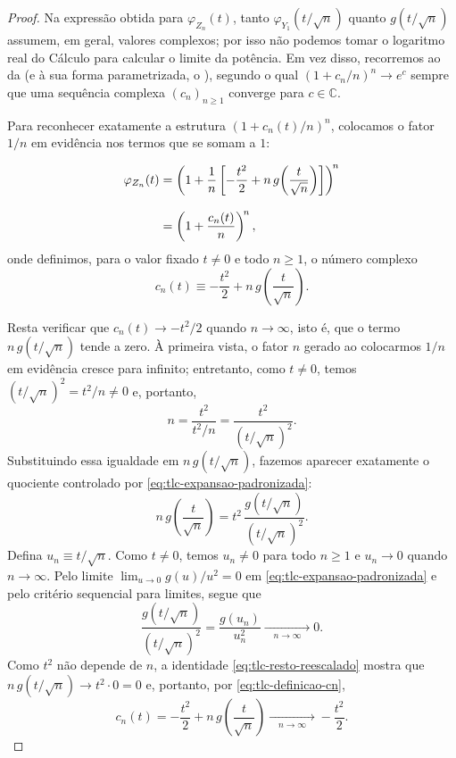 \documentclass[12pt,portuguese]{article}
\theoremstyle{definition}
\theoremstyle{plainexercise}
\theoremstyle{starredexercise}
\theoremstyle{definition}
\begin{document}
\begin{proof}
Na expressão obtida para $\varphi_{Z_n}(t)$, tanto $\varphi_{Y_1}(t/\sqrt{n})$
quanto $g(t/\sqrt{n})$ assumem, em geral, valores complexos; por isso não
podemos tomar o logaritmo real do Cálculo para calcular o limite da potência.
Em vez disso, recorremos ao  da
 (e à sua forma parametrizada, o
), segundo o qual $(1+c_n/n)^n\to e^c$ sempre
que uma sequência complexa $(c_n)_{n\geqslant1}$ converge para
$c\in\mathbb{C}$.

Para reconhecer exatamente a estrutura $(1+c_n(t)/n)^n$, colocamos o fator
$1/n$ em evidência nos termos que se somam a $1$:
\begin{samepage}
\begin{align}
\varphi_{Z_n}(t)
&=\left(
1+\frac{1}{n}\left[-\frac{t^2}{2}+n\,g\!\left(\frac{t}{\sqrt{n}}\right)\right]
\right)^{\!n}\notag
\\[0.3cm]
&=\left(1+\frac{c_n(t)}{n}\right)^{\!n},
\label{eq:man-fatoracao-zn}
\end{align}
onde definimos, para o valor fixado $t\neq0$ e todo $n\geqslant1$, o número
complexo
\begin{equation}\label{eq:tlc-definicao-cn}
c_n(t)\equiv-\frac{t^2}{2}+n\,g\!\left(\frac{t}{\sqrt{n}}\right).
\end{equation}
\end{samepage}

Resta verificar que $c_n(t)\to-t^2/2$ quando $n\to\infty$, isto é, que o
termo $n\,g(t/\sqrt{n})$ tende a zero. À primeira vista, o fator $n$ gerado
ao colocarmos $1/n$ em evidência cresce para infinito; entretanto, como
$t\neq0$, temos $(t/\sqrt{n})^2=t^2/n\neq0$ e, portanto,
\[
n=\frac{t^2}{t^2/n}=\frac{t^2}{(t/\sqrt{n})^2}.
\]
Substituindo essa igualdade em $n\,g(t/\sqrt{n})$, fazemos aparecer
exatamente o quociente controlado por \eqref{eq:tlc-expansao-padronizada}:
\begin{equation}\label{eq:tlc-resto-reescalado}
n\,g\!\left(\frac{t}{\sqrt{n}}\right)
=t^2\,\frac{g(t/\sqrt{n})}{(t/\sqrt{n})^2}.
\end{equation}
Defina $u_n\equiv t/\sqrt{n}$. Como $t\neq0$, temos $u_n\neq0$ para todo
$n\geqslant1$ e $u_n\to0$ quando $n\to\infty$. Pelo limite
$\lim_{u\to0}g(u)/u^2=0$ em \eqref{eq:tlc-expansao-padronizada} e pelo
critério sequencial para limites, segue que
\[
\frac{g(t/\sqrt{n})}{(t/\sqrt{n})^2}
=\frac{g(u_n)}{u_n^2}
\xrightarrow[\quad n\to\infty\quad]{}0.
\]
Como $t^2$ não depende de $n$, a identidade \eqref{eq:tlc-resto-reescalado}
mostra que $n\,g(t/\sqrt{n})\to t^2\cdot0=0$ e, portanto, por
\eqref{eq:tlc-definicao-cn},
\[
c_n(t)
=-\frac{t^2}{2}+n\,g\!\left(\frac{t}{\sqrt{n}}\right)
\xrightarrow[\quad n\to\infty\quad]{}-\frac{t^2}{2}.
\]


\end{proof}
\end{document}
